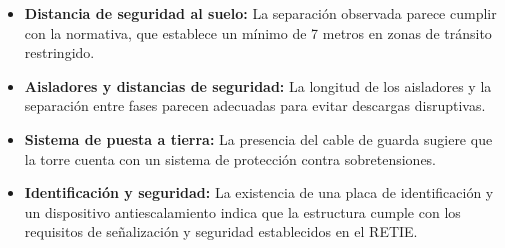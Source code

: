 \begin{itemize}
    \item \textbf{Distancia de seguridad al suelo:} La separación observada parece cumplir con la normativa, que establece un mínimo de 7 metros en zonas de tránsito restringido.
    \item \textbf{Aisladores y distancias de seguridad:} La longitud de los aisladores y la separación entre fases parecen adecuadas para evitar descargas disruptivas.
    \item \textbf{Sistema de puesta a tierra:} La presencia del cable de guarda sugiere que la torre cuenta con un sistema de protección contra sobretensiones.
    \item \textbf{Identificación y seguridad:} La existencia de una placa de identificación y un dispositivo antiescalamiento indica que la estructura cumple con los requisitos de señalización y seguridad establecidos en el RETIE.
\end{itemize}
